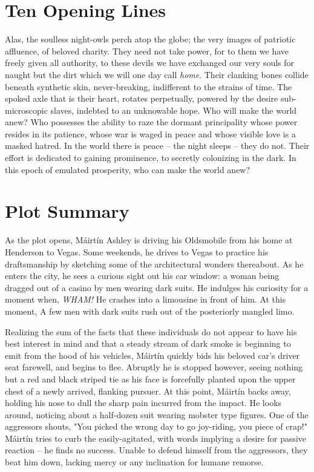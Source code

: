 \documentclass[12pt]{article}
\newcommand{\mcs}{M\'airt\'in }
\begin{document}
\begin{flushleft}
\section{Ten Opening Lines}

Alas, the soulless night-owls perch atop the globe; the very images of patriotic affluence, of beloved charity.
They need not take power, for to them we have freely given all authority, to these devils we have exchanged our very
souls for naught but the dirt which we will one day call \emph{home}.
Their clanking bones collide beneath synthetic skin, never-breaking, indifferent to the strains of time.
The spoked axle that is their heart, rotates perpetually, powered by the desire sub-microscopic slaves,
indebted to an unknowable hope. Who will make the world anew? Who possesses the ability to raze the dormant principality whose
power resides in its patience, whose war is waged in peace and whose visible love is a masked hatred.
In the world there is peace -- the night sleeps -- they do not. Their effort is dedicated to gaining prominence,
to secretly colonizing in the dark. In this epoch of emulated prosperity, who can make the world anew?

\section{Plot Summary}

As the plot opens, \mcs Ashley is driving his Oldsmobile from his home at Henderson
to Vegas. Some weekends, he drives to Vegas to practice his draftsmanship by sketching some of
the architectural wonders thereabout. As he enters the city, he sees a curious sight out his car window: 
a woman being dragged out of a casino by men wearing dark suits. He indulges 
his curiosity for a moment when, \emph{WHAM!} He crashes into a limousine in front of him. At this moment,
A few men with dark suits rush out of the posteriorly mangled limo.

Realizing the sum of the facts that these individuals do not appear to have his best interest in mind and that a
steady stream of dark smoke is beginning to emit from the hood of his vehicles, \mcs quickly bids his beloved
car's driver seat farewell, and begins to flee. Abruptly he is stopped however, seeing nothing but a red and
black striped tie as his face is forcefully planted upon the upper chest of a newly arrived, flanking pursuer. 
At this point, \mcs backs away, holding his nose to dull the sharp pain incurred from the impact. He looks
around, noticing about a half-dozen suit wearing mobster type figures. One of the aggressors shouts, "You
picked the wrong day to go joy-riding, you piece of crap!" \mcs tries to curb the easily-agitated, with words
implying a desire for passive reaction -- he finds no success. Unable to defend himself from the aggressors,
they beat him down, lacking mercy or any inclination for humane remorse.


\end{flushleft}
\end{document}
